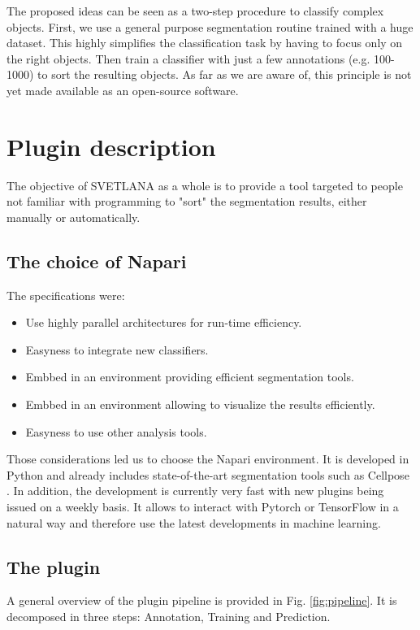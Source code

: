 \documentclass{article}
\begin{document}
The proposed ideas can be seen as a two-step procedure to classify complex objects. First, we use a general purpose segmentation routine trained with a huge dataset. This highly simplifies the classification task by having to focus only on the right objects. Then train a classifier with just a few annotations (e.g. 100-1000) to sort the resulting objects. As far as we are aware of, this principle is not yet made available as an open-source software.

\section{Plugin description}
\label{sec:format}

The objective of SVETLANA as a whole is to provide a tool targeted to people not familiar with programming to "sort" the segmentation results, either manually or automatically. 

\subsection{The choice of Napari}
The specifications were:
\begin{itemize}
  \setlength{\itemsep}{3pt}%
  \setlength{\parskip}{0pt}%
  \item Use highly parallel architectures for run-time efficiency.
  \item Easyness to integrate new classifiers.
  \item Embbed in an environment providing efficient segmentation tools.
  \item Embbed in an environment allowing to visualize the results efficiently.
  \item Easyness to use other analysis tools.
\end{itemize}
Those considerations led us to choose the Napari environment. 
It is developed in Python and already includes state-of-the-art segmentation tools such as Cellpose \cite{stringer2021cellpose}. 
In addition, the development is currently very fast with new plugins being issued on a weekly basis.
It allows to interact with Pytorch or TensorFlow in a natural way and therefore use the latest developments in machine learning.

\subsection{The plugin}

A general overview of the plugin pipeline is provided in Fig. \ref{fig:pipeline}. 
It is decomposed in three steps: Annotation, Training and Prediction.
\end{document}
